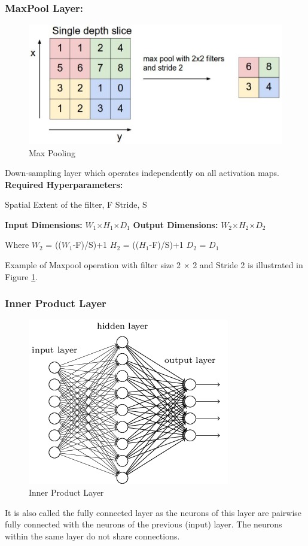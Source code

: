 \subsubsection{MaxPool Layer:}
\begin{figure}[h!]
  \centering
  \includegraphics[width=0.7\linewidth]{figures/maxpool.PNG}
  \caption{Max Pooling
  \cite{cnn_ak}}
  \label{fig:maxpool}
\end{figure}
Down-sampling layer which operates independently on all activation maps.
\textbf{Required Hyperparameters:}
  \begin{adjustwidth}{2cm}{}
  Spatial Extent of the filter, F \newline
  Stride, S 
  \end{adjustwidth}
\textbf{Input Dimensions:} $W_1$×$H_1$×$D_1$ \newline
\textbf{Output Dimensions:} $W_2$×$H_2$×$D_2$ 
  \begin{adjustwidth}{2cm}{}
  Where \newline
  $W_2$ = (($W_1$-F)/S)+1 \newline
  $H_2$ = (($H_1$-F)/S)+1 \newline
  $D_2$ = $D_1$
  \end{adjustwidth}
Example of Maxpool operation with filter size 2 × 2 and Stride 2 is illustrated in Figure \ref{fig:maxpool}.
\subsubsection{Inner Product Layer}
\begin{figure}[h!]
  \centering
  \includegraphics[width=0.5\linewidth]{figures/FCLayer.png}
  \caption{Inner Product Layer
  \cite{cnn_ak}}
  \label{fig:FCLayer}
\end{figure}
It is also called the fully connected layer as the neurons of this layer are pairwise fully connected with the neurons of the previous (input) layer. The neurons within the same layer do not share connections.
